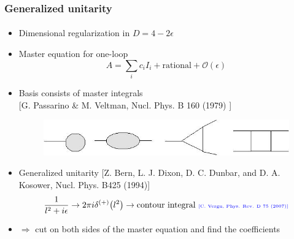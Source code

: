 \documentclass[english]{beamer}
\begin{document}
\begin{frame}
\frametitle{Generalized unitarity}
\framesubtitle{}
\begin{itemize}
\item<1-> Dimensional regularization in $D = 4-2\epsilon$
\item<2-> Master equation for one-loop
\begin{equation*}
A = \sum_i c_i I_i + \mathrm{rational} + \mathcal{O}(\epsilon)
\end{equation*}
\item<3-> Basis consists of master integrals
\\
\tiny\color{blue}
[G. Passarino \& M. Veltman, Nucl. Phys. B 160 (1979)
]
\color{black}\normalsize

\begin{figure}[h]
  \centering
  \includegraphics[width=0.5\linewidth]{master_integrals.jpg}
\end{figure}

\item<4-> Generalized unitarity 
\tiny\color{blue}
[Z. Bern, L. J. Dixon, D. C. Dunbar, and D. A. Kosower, Nucl. Phys. B425 (1994)]
\color{black}\normalsize
\begin{equation*}
\frac{1}{l^2 + i\epsilon} \rightarrow 2\pi i\delta^{(+)}\big(l^2\big) \rightarrow \textrm{contour integral \tiny\color{blue}[C. Vergu, Phys. Rev. D 75 (2007)]\color{black}\normalsize
}
\end{equation*}
\item<5->[] $\Rightarrow$ cut on both sides of the master equation and find the coefficients

\end{itemize}

\end{frame}
\end{document}
